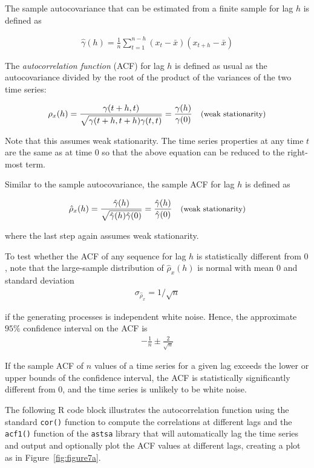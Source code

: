 The sample autocovariance that can be estimated from a finite sample for lag $h$ is defined as  

\begin{align*}
\hat{\gamma}(h)  = \frac{1}{n} \sum_{t=1}^{n-h} (x_t - \bar{x})(x_{t+h} - \bar{x})
\end{align*}

The \emph{autocorrelation function} (ACF) for lag $h$ is defined as usual as the autocovariance divided by the root of the product of the variances of the two time series:

\begin{align*}
\rho_x(h) = \frac{\gamma (t+h,t)}{\sqrt{\gamma (t+h,t+h) \gamma(t, t)}} = \frac{\gamma(h)}{\gamma(0)}  \quad \text{\small (weak stationarity)}
\end{align*}

Note that this assumes weak stationarity. The time series properties at any time $t$ are the same as at time $0$ so that the above equation can be reduced to the right-most term.

Similar to the sample autocovariance, the sample ACF for lag $h$ is defined as

\begin{align*}
\hat\rho_x(h) = \frac{\hat\gamma(h)}{\sqrt{\hat\gamma(h) \hat\gamma(0)}} = \frac{\hat\gamma(h)}{\hat\gamma(0)} \quad \text{\small (weak stationarity)}
\end{align*}

\noindent where the last step again assumes weak stationarity.

To test whether the ACF of any sequence for lag $h$ is statistically different from $0$, note that the large-sample distribution of $\hat{\rho}_{x}(h)$ is normal with mean $0$ and standard deviation
\begin{align*}
\sigma_{\hat{\rho}_{x}} = 1/ \sqrt{n} 
\end{align*}

\noindent if the generating processes is independent white noise. Hence, the approximate $95\%$ confidence interval on the ACF is
\begin{align*}
-\frac{1}{n} \pm \frac{2}{\sqrt{n}}
\end{align*}

If the sample ACF of $n$ values of a time series for a given lag exceeds the lower or upper bounds of the confidence interval, the ACF is statistically significantly different from $0$, and the time series is unlikely to be white noise.

The following R code block illustrates the autocorrelation function using the standard \texttt{cor()} function to compute the correlations at different lags and the \texttt{acf1()} function of the \texttt{astsa} library that will automatically lag the time series and output and optionally plot the ACF values at different lags, creating a plot as in Figure~\ref{fig:figure7a}.

